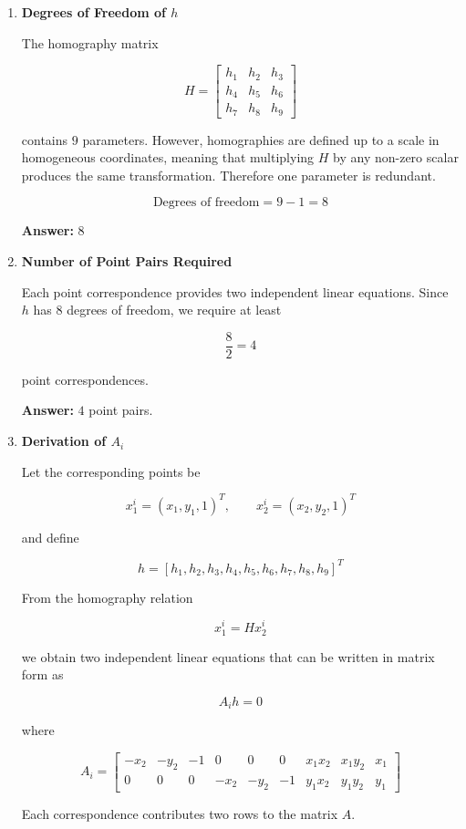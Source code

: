 \documentclass[12pt]{article}
\begin{document}
\begin{enumerate}

\item \textbf{Degrees of Freedom of $h$}

The homography matrix

\[
H =
\begin{bmatrix}
h_1 & h_2 & h_3 \\
h_4 & h_5 & h_6 \\
h_7 & h_8 & h_9
\end{bmatrix}
\]

contains $9$ parameters. However, homographies are defined up to a scale in homogeneous coordinates, meaning that multiplying $H$ by any non-zero scalar produces the same transformation. Therefore one parameter is redundant.

\[
\text{Degrees of freedom} = 9 - 1 = 8
\]

\textbf{Answer:} $8$

\item \textbf{Number of Point Pairs Required}

Each point correspondence provides two independent linear equations. Since $h$ has $8$ degrees of freedom, we require at least

\[
\frac{8}{2} = 4
\]

point correspondences.

\textbf{Answer:} $4$ point pairs.

\item \textbf{Derivation of $A_i$}

Let the corresponding points be

\[
x_1^i = (x_1, y_1, 1)^T, \qquad
x_2^i = (x_2, y_2, 1)^T
\]

and define

\[
h =
[h_1,h_2,h_3,h_4,h_5,h_6,h_7,h_8,h_9]^T
\]

From the homography relation

\[
x_1^i = Hx_2^i
\]

we obtain two independent linear equations that can be written in matrix form as

\[
A_i h = 0
\]

where

\[
A_i =
\begin{bmatrix}
-x_2 & -y_2 & -1 & 0 & 0 & 0 & x_1x_2 & x_1y_2 & x_1 \\
0 & 0 & 0 & -x_2 & -y_2 & -1 & y_1x_2 & y_1y_2 & y_1
\end{bmatrix}
\]

Each correspondence contributes two rows to the matrix $A$.


\end{enumerate}
\end{document}
